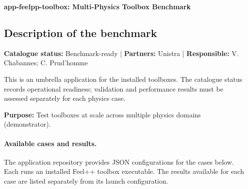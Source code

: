 \textbf{app-feelpp-toolbox: Multi-Physics Toolbox Benchmark}
\label{sec:app:specs:app-feelpp-toolbox}



\subsection{Description of the benchmark}
\textbf{Catalogue status:} Benchmark-ready | \textbf{Partners:} Unistra | \textbf{Responsible:} V. Chabannes; C. Prud'homme

This is an umbrella application for the installed \Feelpp toolboxes.
The catalogue status records operational readiness; validation and performance
results must be assessed separately for each physics case.

\textbf{Purpose:} Test \Feelpp toolboxes at scale across multiple physics domains (demonstrator).

\paragraph{Available cases and results.}
The application repository provides JSON configurations for the cases below.
Each runs an installed Feel++ toolbox executable. The results available for
each case are listed separately from its launch configuration.

